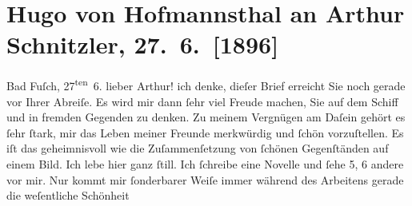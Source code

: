 

         
         \newcommand{\erwaehntePersonen}{Personen: }
         \newcommand{\erwaehnteInstitutionen}{}
         \newcommand{\erwaehnteOrte}{Orte: Bad Fusch, Wien}
         \newcommand{\erwaehnteWerke}{Werke: Geschichte der beiden Liebespaare}
               \section[Hugo von Hofmannsthal an Arthur Schnitzler, 27. 6. {[}1896{]}]{ Hugo von Hofmannsthal an Arthur Schnitzler,
                    27. 6. {[}1896{]}}\nopagebreak{}\rehead{ }\begin{ledgroupsized}[t]{13cm}\normalsize\beginnumbering \toendnotes[C]{\smallbreak\pagebreak[2]} 
\toendnotes[C]{\smallbreak}\pstart
           \raggedleft{}{\pb}Bad Fuſch, 27\textsuperscript{ten} 6.\pend
           \pstart{}lieber Arthur!\pend\pstart
           ich denke, dieſer Brief erreicht Sie noch gerade vor Ihrer Abreiſe. Es wird mir
                    dann ſehr viel Freude machen, Sie auf dem Schiff und in fremden Gegenden zu
                    denken. Zu meinem Vergnügen am Daſein gehört es ſehr ſtark, mir das Leben meiner
                    Freunde merkwürdig und ſchön vorzuſtellen. Es iſt das geheimnis{\pb}voll wie die Zuſammenſetzung
                    von ſchönen Gegenſtänden auf einem Bild.\pend
           \pstart
           Ich lebe hier ganz ſtill. Ich ſchreibe eine Novelle und ſehe 5, 6 andere vor mir. Nur kommt mir
                    ſonderbarer Weiſe immer während des Arbeitens gerade die weſentliche Schönheit

\end{ledgroupsized}
